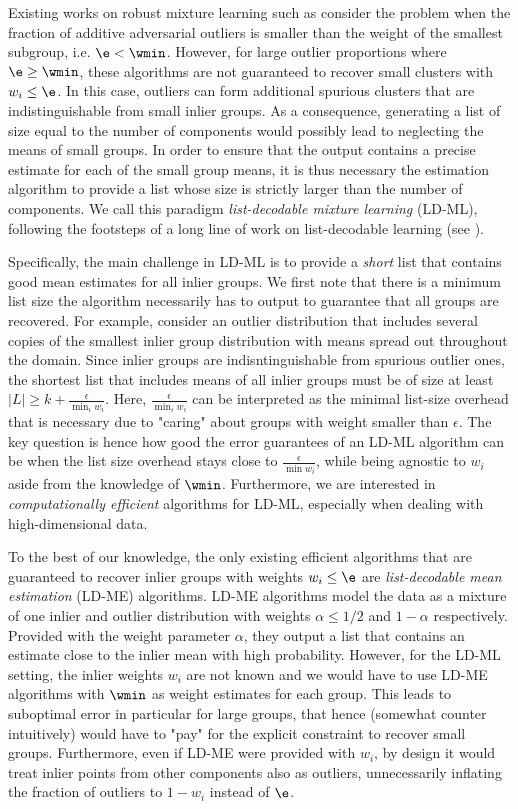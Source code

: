 Existing works on robust mixture learning such as \cite{diakonikolas2018list,bakshi2022robustly}
consider the problem when the fraction of additive adversarial outliers is smaller than the weight of the smallest subgroup, i.e. \(\e < \wmin\).
However, for large outlier proportions where $\e \geq \wmin$, these algorithms are not guaranteed to recover small clusters with  \(w_i \leq \e\). 
In this case, outliers can form additional spurious clusters
that are indistinguishable 
from small inlier groups. As a consequence, generating a list of size equal to the number of components would possibly lead to neglecting the means of small groups.
In order to ensure that the output contains 
a precise estimate for each of the small group means, 
it is thus necessary  
the estimation algorithm to provide a list whose size is strictly larger than the number of components.
We call this paradigm \emph{list-decodable mixture learning} (LD-ML),
following the footsteps of a long line of work on list-decodable learning (see ). 

Specifically, the main challenge in LD-ML is to provide a \emph{short} list that contains good mean estimates for all inlier groups.
We first note that there is a minimum list size the algorithm necessarily has to output to guarantee that all groups are recovered. For example, consider an outlier distribution that includes several copies of the smallest inlier group distribution with means spread out throughout the domain. Since inlier groups are indisntinguishable from spurious outlier ones, the shortest list that includes means of all inlier groups must be of size at least $|L| \geq k + \frac{\epsilon}{\min_i w_i}$. Here, $\frac{\epsilon}{\min_i w_i}$ can be interpreted as the minimal list-size overhead that is necessary due to "caring" about groups with weight smaller than $\epsilon$.
The key question is hence how good the error guarantees of an LD-ML algorithm can be when the list size overhead stays close to $\frac{\epsilon}{\min w_i}$,
while being agnostic to $w_i$ aside from the knowledge of $\wmin$.
Furthermore, we are interested in \textit{computationally efficient} algorithms for LD-ML, especially when dealing with high-dimensional data.

To the best of our knowledge, the only existing efficient algorithms that are guaranteed to recover inlier groups with weights \(w_i \leq \e\) are \emph{list-decodable mean estimation} (LD-ME) algorithms. 
LD-ME algorithms model the data as a mixture of one inlier and outlier distribution with weights \(\alpha \leq 1/2\) and \(1 - \alpha\) respectively. Provided with the weight parameter \(\alpha\), they output a list that contains an estimate
close to the inlier mean with high probability. However, for the LD-ML setting,
the inlier weights $w_i$ are not known and we would have to use LD-ME algorithms
with $\wmin$ as weight estimates for each group.
This leads to suboptimal error in particular for 
large groups, that hence (somewhat counter intuitively) would have to "pay" for
the explicit constraint to recover small groups.
Furthermore, even if LD-ME were provided with \(w_i\), by design it would treat inlier points from other components also as outliers, unnecessarily inflating the fraction of outliers to \(1 - w_i\)
instead of \(\e\). 
